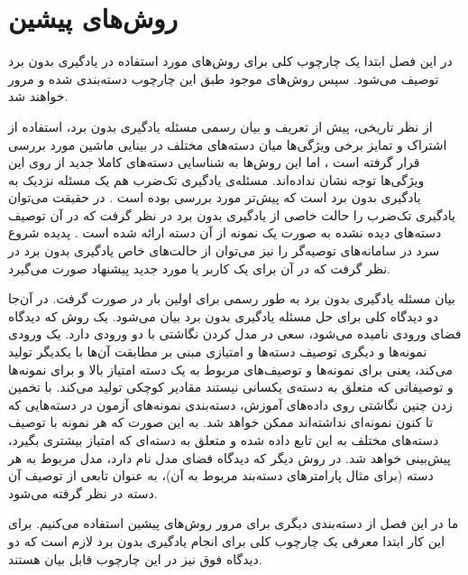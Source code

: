 \chapter{روش‌های پیشین} \label{chap:lr}
در این فصل ابتدا یک چارچوب کلی برای روش‌های مورد استفاده در یادگیری بدون برد توصیف می‌شود. سپس روش‌های موجود طبق این چارچوب دسته‌بندی شده و مرور خواهند شد.


از نظر تاریخی، پیش از تعریف و بیان رسمی مسئله یادگیری بدون برد، استفاده از اشتراک و تمایز برخی ویژگی‌ها میان دسته‌های مختلف در بینایی ماشین مورد بررسی قرار گرفته است
\cite{BakkerH03, TsochantaridisJHA05, ulman2005}،
اما این روش‌ها به شناسایی دسته‌های کاملا جدید از روی این ویژگی‌ها توجه نشان نداده‌اند.
مسئله‌ی یادگیری تک‌ضرب
هم یک مسئله نزدیک به یادگیری بدون برد است که پیش‌تر مورد بررسی بوده است
\cite{miller12}.
در حقیقت می‌توان یادگیری تک‌ضرب را حالت خاصی از یادگیری بدون برد در نظر گرفت که در آن توصیف دسته‌های دیده نشده به صورت یک نمونه از آن دسته ارائه شده است
\cite{bengio08}.
 پدیده شروع سرد
 در سامانه‌های توصیه‌گر
 را نیز می‌توان از حالت‌های خاص یادگیری بدون برد در نظر گرفت که در آن برای یک کاربر یا مورد جدید پیشنهاد صورت می‌گیرد.


بیان مسئله  یادگیری بدون برد به طور رسمی برای اولین بار در
\cite{bengio08}
صورت گرفت. در آن‌جا دو دیدگاه کلی برای حل مسئله یادگیری بدون برد بیان می‌شود. یک روش که دیدگاه فضای ورودی
نامیده می‌شود، سعی در مدل کردن نگاشتی با دو ورودی دارد. یک ورودی نمونه‌ها و دیگری توصیف دسته‌ها و امتیازی مبنی بر مطابقت آن‌ها با یکدیگر تولید می‌کند، یعنی برای نمونه‌ها و توصیف‌های مربوط به یک دسته امتیاز بالا و برای نمونه‌ها و توصیفاتی که متعلق به دسته‌ی یکسانی نیستند مقادیر کوچکی تولید می‌کند. با تخمین زدن چنین نگاشتی روی داده‌های آموزش، دسته‌بندی نمونه‌های آزمون در دسته‌هایی که تا کنون نمونه‌ای نداشته‌اند ممکن خواهد شد. به این صورت که هر نمونه با توصیف دسته‌های مختلف به این تابع داده شده و متعلق به دسته‌ای که امتیاز بیشتری بگیرد، پیش‌بینی خواهد شد.
در روش دیگر که دیدگاه فضای مدل
نام دارد، مدل مربوط به هر دسته (برای مثال پارامترهای دسته‌بند مربوط به آن)، به عنوان تابعی از توصیف آن دسته در نظر گرفته می‌شود.

ما در این فصل از دسته‌بندی دیگری برای مرور روش‌های پیشین استفاده می‌کنیم. برای این کار ابتدا معرفی یک چارچوب کلی برای انجام یادگیری بدون برد لازم است که دو دیدگاه فوق نیز در این چارچوب قابل بیان هستند.

